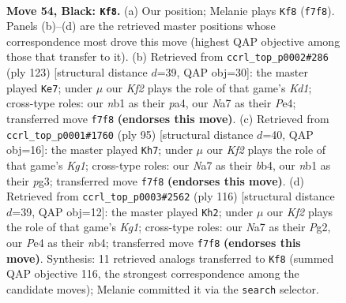\documentclass[11pt]{article}
\begin{document}
\clearpage

\begin{figure}[p]\centering
\begin{subfigure}{0.46\textwidth}\centering
\resizebox{\linewidth}{!}{%
\newchessgame
\chessboard[
  setfen={8/n1P2k1K/p7/P4p1p/4pB2/5bP1/8/RN1r4 b - - 15 54},
  showmover=false,
  pgfstyle=straightmove, color=movearrow, markmove={f7-f8}
]}
\caption{}
\end{subfigure}\hfill
\begin{subfigure}{0.46\textwidth}\centering
\resizebox{\linewidth}{!}{%
\newchessgame
\chessboard[
  setfen={3k4/8/2p4p/r2b3P/P3pP2/4K3/8/R2B4 b - - 2 62},
  showmover=false,
  pgfstyle=straightmove, color=movearrow, markmove={d8-e7}
]}
\caption{}
\end{subfigure}
\\[4pt]
\begin{subfigure}{0.46\textwidth}\centering
\resizebox{\linewidth}{!}{%
\newchessgame
\chessboard[
  setfen={6k1/6p1/5p2/3b3p/1B3P1P/P1R3P1/6r1/3K4 b - - 8 48},
  showmover=false,
  pgfstyle=straightmove, color=movearrow, markmove={g8-h7}
]}
\caption{}
\end{subfigure}\hfill
\begin{subfigure}{0.46\textwidth}\centering
\resizebox{\linewidth}{!}{%
\newchessgame
\chessboard[
  setfen={2R3b1/1B5k/4r1p1/PN5p/1np4P/8/6P1/6K1 w - - 7 59},
  showmover=false,
  pgfstyle=straightmove, color=movearrow, markmove={g1-h2}
]}
\caption{}
\end{subfigure}
\caption{\textbf{Move 54, Black: \texttt{Kf8}.} (a) Our position; Melanie plays \texttt{Kf8} (\texttt{f7f8}). Panels (b)--(d) are the retrieved master positions whose correspondence most drove this move (highest QAP objective among those that transfer to it). (b) Retrieved from \texttt{ccrl\_top\_p0002\#286} (ply 123) [structural distance $d$=39, QAP obj=30]: the master played \texttt{Ke7}; under $\mu$ our \emph{Kf2} plays the role of that game's \emph{Kd1}; cross-type roles: our \emph{n}b1 as their \emph{p}a4, our \emph{N}a7 as their \emph{P}e4; transferred move \texttt{f7f8} \textbf{(endorses this move)}. (c) Retrieved from \texttt{ccrl\_top\_p0001\#1760} (ply 95) [structural distance $d$=40, QAP obj=16]: the master played \texttt{Kh7}; under $\mu$ our \emph{Kf2} plays the role of that game's \emph{Kg1}; cross-type roles: our \emph{N}a7 as their \emph{b}b4, our \emph{n}b1 as their \emph{p}g3; transferred move \texttt{f7f8} \textbf{(endorses this move)}. (d) Retrieved from \texttt{ccrl\_top\_p0003\#2562} (ply 116) [structural distance $d$=39, QAP obj=12]: the master played \texttt{Kh2}; under $\mu$ our \emph{Kf2} plays the role of that game's \emph{Kg1}; cross-type roles: our \emph{N}a7 as their \emph{P}g2, our \emph{P}e4 as their \emph{n}b4; transferred move \texttt{f7f8} \textbf{(endorses this move)}. Synthesis: 11 retrieved analogs transferred to \texttt{Kf8} (summed QAP objective 116, the strongest correspondence among the candidate moves); Melanie committed it via the \texttt{search} selector.}
\label{fig:thought-m107}
\end{figure}
\end{document}
